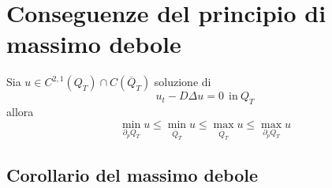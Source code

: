 \section{Conseguenze del principio di massimo debole}

Sia $u\in C^{2,1}(Q_{T}) \cap C(\overline{Q}_{T})$ soluzione di
\begin{equation*}
    u_{t} -D\Delta u=0\ \ \text{in} \ Q_{T}
\end{equation*}
allora
\begin{equation*}
    \min_{\partial _{p} Q_{T}} u\leq \min_{\overline{Q}_{T}} u\leq \max_{\overline{Q}_{T}} u\leq \max_{\partial _{p} Q_{T}} u
\end{equation*}
\subsection{Corollario del massimo debole}


